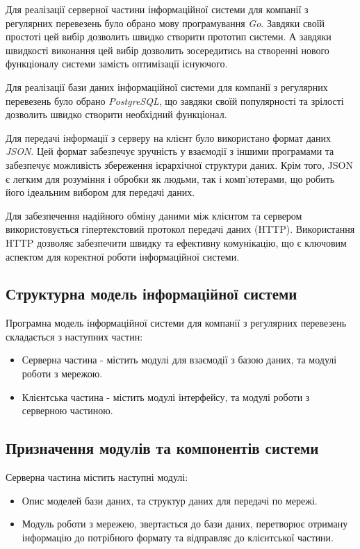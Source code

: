\documentclass[oneside,14pt]{extarticle}
\begin{document}
Для реалізації серверної частини інформаційної системи для компанії з регулярних перевезень було обрано мову програмування \textit{Go}. Завдяки своїй простоті цей вибір дозволить швидко створити прототип системи. А завдяки швидкості виконання цей вибір дозволить зосередитись на створенні нового функціоналу системи замість оптимізації існуючого.

Для реалізації бази даних інформаційної системи для компанії з регулярних перевезень було обрано \textit{PostgreSQL}, що завдяки своїй популярності та зрілості дозволить швидко створити необхідний функціонал.

Для передачі інформації з серверу на клієнт було використано формат даних \textit{JSON}. Цей формат забезпечує зручність у взаємодії з іншими програмами та забезпечує можливість збереження ієрархічної структури даних. Крім того, JSON є легким для розуміння і обробки як людьми, так і комп'ютерами, що робить його ідеальним вибором для передачі даних.

Для забезпечення надійного обміну даними між клієнтом та сервером використовується гіпертекстовий протокол передачі даних (HTTP). Використання HTTP дозволяє забезпечити швидку та ефективну комунікацію, що є ключовим аспектом для коректної роботи інформаційної системи.

\subsection{Структурна модель інформаційної системи}
Програмна модель інформаційної системи для компанії з регулярних перевезень складається з наступних  частин:

\begin{itemize}
\item Серверна частина - містить модулі для взаємодії з базою даних, та модулі роботи з мережою.
\item Клієнтська частина - містить модулі інтерфейсу, та модулі роботи з серверною частиною.
\end{itemize}

\subsection{Призначення модулів та компонентів системи}
Серверна частина містить наступні модулі:
\begin{itemize}
\item Опис моделей бази даних, та структур даних для передачі по мережі.
\item Модуль роботи з мережею, звертається до бази даних, перетворює отриману інформацію до потрібного формату та відправляє до клієнтської частини.
\end{itemize}
\end{document}
